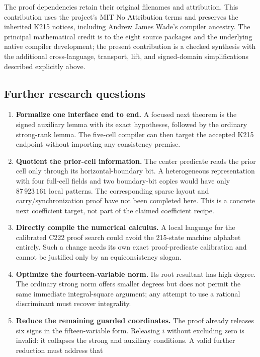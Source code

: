 \documentclass[11pt,a4paper]{article}
\theoremstyle{definition}\newtheorem{definition}[theorem]{Definition}
\theoremstyle{remark}\newtheorem{remark}[theorem]{Remark}
\begin{document}
The proof dependencies retain their original filenames and attribution.
This contribution uses the project's MIT No Attribution terms and
preserves the inherited K215 notices, including Andrew James Wade's
compiler ancestry. The principal mathematical credit is to the eight
source packages and the underlying native compiler development; the
present contribution is a checked synthesis with the additional
cross-language, transport, lift, and signed-domain simplifications
described explicitly above.

\subsection{Further research questions}

\begin{enumerate}
\item \textbf{Formalize one interface end to end.} A focused next theorem
is the signed auxiliary lemma with its exact hypotheses, followed by
the ordinary strong-rank lemma. The five-cell compiler can then target
the accepted K215 endpoint without importing any consistency premise.
\item \textbf{Quotient the prior-cell information.} The center predicate
reads the prior cell only through its horizontal-boundary bit. A
heterogeneous representation with four full-cell fields and two
boundary-bit copies would have only \(87\,923\,161\) local patterns.
The corresponding sparse layout and carry/synchronization proof have
not been completed here. This is a concrete next coefficient target,
not part of the claimed coefficient recipe.
\item \textbf{Directly compile the numerical calculus.} A local language
for the calibrated C222 proof search could avoid the 215-state machine
alphabet entirely. Such a change needs its own exact proof-predicate
calibration and cannot be justified only by an equiconsistency slogan.
\item \textbf{Optimize the fourteen-variable norm.} Its root resultant
has high degree. The ordinary strong norm offers smaller degrees but
does not permit the same immediate integral-square argument; any
attempt to use a rational discriminant must recover integrality.
\item \textbf{Reduce the remaining guarded coordinates.} The proof
already releases six signs in the fifteen-variable form. Releasing
\(i\) without excluding zero is invalid: it collapses the strong
and auxiliary conditions. A valid further reduction must address that

\end{enumerate}
\end{document}
